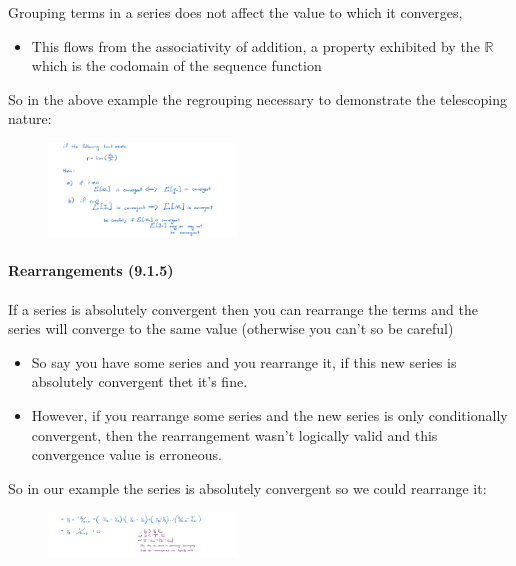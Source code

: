 \documentclass[class=article, crop=false]{standalone}
\begin{document}
Grouping terms in a series does not affect the value to which it
converges,

\begin{itemize}
\item
  This flows from the associativity of addition, a property exhibited by
  the \(\mathbb{R}\) which is the codomain of the sequence function
\end{itemize}

So in the above example the regrouping necessary to demonstrate the
telescoping nature:

\begin{figure}
\centering
\includegraphics[width=5cm]{media/InfSeries/67331FF8-C7AD-4BE3-ADAE-2D291C4A5D89.jpeg}
\caption{}
\end{figure}

\newpage
\hypertarget{header-n3232}{%
\paragraph{Rearrangements (9.1.5)}\label{header-n3232}}

If a series is absolutely convergent then you can rearrange the terms
and the series will converge to the same value (otherwise you can't so
be careful)

\begin{itemize}
\item
  So say you have some series and you rearrange it, if this new series
  is absolutely convergent thet it's fine.
\item
  However, if you rearrange some series and the new series is only
  conditionally convergent, then the rearrangement wasn't logically
  valid and this convergence value is erroneous. 
\end{itemize}

So in our example the series is absolutely convergent so we could
rearrange it:

\begin{figure}
\centering
\includegraphics[width=5cm]{media/InfSeries/83FE5712-DC18-44D6-A9A3-FF7CB63F6AE9.jpeg}
\caption{}
\end{figure}
\end{document}
